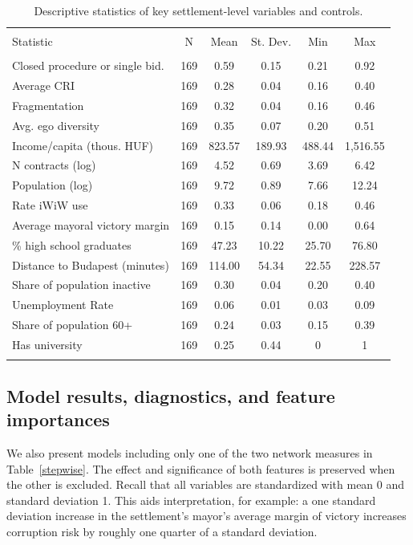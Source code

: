 \begin{table} \centering 
\begin{tabular}{@{\extracolsep{3pt}}lccccc} 
\\[-1.8ex]\hline 
\hline \\[-1.8ex] 
Statistic & \multicolumn{1}{c}{N} & \multicolumn{1}{c}{Mean} & \multicolumn{1}{c}{St. Dev.} & \multicolumn{1}{c}{Min} & \multicolumn{1}{c}{Max} \\ 
\hline \\[-1.8ex] 
Closed procedure or single bid. & 169 & 0.59 & 0.15 & 0.21 & 0.92 \\ 
Average CRI & 169 & 0.28 & 0.04 & 0.16 & 0.40 \\ 
Fragmentation & 169 & 0.32 & 0.04 & 0.16 & 0.46 \\ 
Avg. ego diversity & 169 & 0.35 & 0.07 & 0.20 & 0.51 \\ 
Income/capita (thous. HUF) & 169 & 823.57 & 189.93 & 488.44 & 1,516.55 \\ 
N contracts (log) & 169 & 4.52 & 0.69 & 3.69 & 6.42 \\ 
Population (log) & 169 & 9.72 & 0.89 & 7.66 & 12.24 \\ 
Rate iWiW use & 169 & 0.33 & 0.06 & 0.18 & 0.46 \\ 
Average mayoral victory margin & 169 & 0.15 & 0.14 & 0.00 & 0.64 \\ 
\% high school graduates & 169 & 47.23 & 10.22 & 25.70 & 76.80 \\ 
Distance to Budapest (minutes) & 169 & 114.00 & 54.34 & 22.55 & 228.57 \\ 
Share of population inactive & 169 & 0.30 & 0.04 & 0.20 & 0.40 \\ 
Unemployment Rate & 169 & 0.06 & 0.01 & 0.03 & 0.09 \\ 
Share of population 60+ & 169 & 0.24 & 0.03 & 0.15 & 0.39 \\ 
Has university & 169 & 0.25 & 0.44 & 0 & 1 \\ 
\hline \\[-1.8ex] 
\end{tabular} 
\caption{Descriptive statistics of key settlement-level variables and controls.}
\label{tab:desc}
\end{table} 


\subsection{Model results, diagnostics, and feature importances}

We also present models including only one of the two network measures in Table~\ref{stepwise}. The effect and significance of both features is preserved when the other is excluded. Recall that all variables are standardized with mean 0 and standard deviation 1. This aids interpretation, for example: a one standard deviation increase in the settlement's mayor's average margin of victory increases corruption risk by roughly one quarter of a standard deviation.

